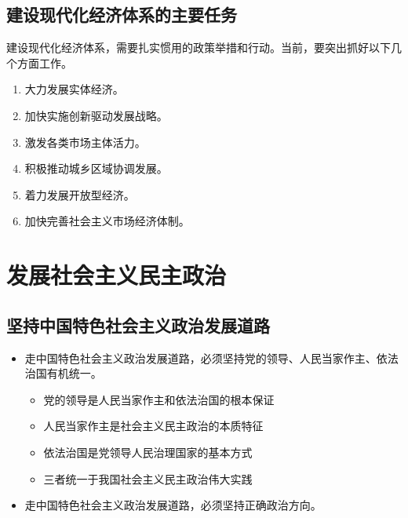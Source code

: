     \subsection{建设现代化经济体系的主要任务}
        建设现代化经济体系，需要扎实惯用的政策举措和行动。当前，要突出抓好以下几个方面工作。
        \begin{enumerate}
            \item 大力发展实体经济。
            \item 加快实施创新驱动发展战略。
            \item 激发各类市场主体活力。
            \item 积极推动城乡区域协调发展。
            \item 着力发展开放型经济。
            \item 加快完善社会主义市场经济体制。
        \end{enumerate}


\section{发展社会主义民主政治}
    \subsection{坚持中国特色社会主义政治发展道路}
        \begin{itemize}
            \item 走中国特色社会主义政治发展道路，必须坚持党的领导、人民当家作主、依法治国有机统一。
            \begin{itemize}
                \item 党的领导是人民当家作主和依法治国的根本保证
                \item 人民当家作主是社会主义民主政治的本质特征
                \item 依法治国是党领导人民治理国家的基本方式
                \item 三者统一于我国社会主义民主政治伟大实践
            \end{itemize}
            \item 走中国特色社会主义政治发展道路，必须坚持正确政治方向。
        \end{itemize}

